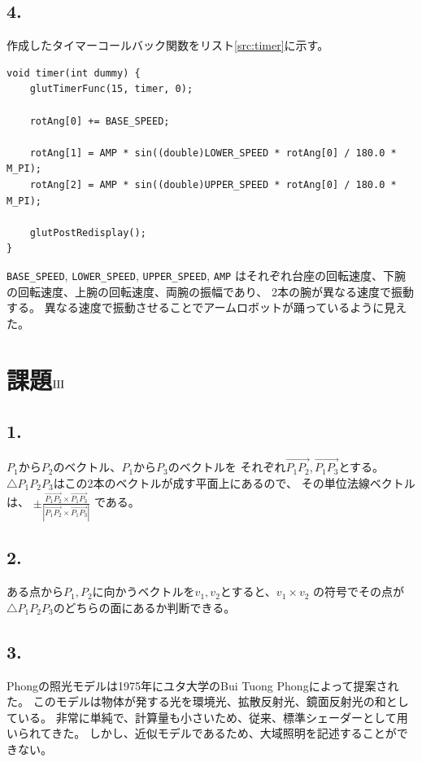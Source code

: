 \documentclass{jsarticle}
\begin{document}
    \subsection*{4.}
        作成したタイマーコールバック関数をリスト\ref{src:timer}に示す。

        \begin{lstlisting}[caption=タイマーコールバック関数, label=src:timer]
void timer(int dummy) {
    glutTimerFunc(15, timer, 0);

    rotAng[0] += BASE_SPEED;

    rotAng[1] = AMP * sin((double)LOWER_SPEED * rotAng[0] / 180.0 * M_PI);
    rotAng[2] = AMP * sin((double)UPPER_SPEED * rotAng[0] / 180.0 * M_PI);

    glutPostRedisplay();
}\end{lstlisting}
        
        \verb|BASE_SPEED|, \verb|LOWER_SPEED|, \verb|UPPER_SPEED|, \verb|AMP|
        はそれぞれ台座の回転速度、下腕の回転速度、上腕の回転速度、両腕の振幅であり、
        2本の腕が異なる速度で振動する。
        異なる速度で振動させることでアームロボットが踊っているように見えた。

\section*{課題$\rm I\hspace{-.01em}I\hspace{-.01em}I$}
    \subsection*{1.}
        $P_1$から$P_2$のベクトル、$P_1$から$P_3$のベクトルを
        それぞれ$\overrightarrow{P_1P_2}, \overrightarrow{P_1P_3}$とする。
        $\triangle{P_1P_2P_3}$はこの2本のベクトルが成す平面上にあるので、
        その単位法線ベクトルは、
        $\displaystyle\pm\frac{\overrightarrow{P_1P_2}\times\overrightarrow{P_1P_3}}{|\overrightarrow{P_1P_2}\times\overrightarrow{P_1P_3}|}$
        である。

    \subsection*{2.}
        ある点から$P_1, P_2$に向かうベクトルを$v_1, v_2$とすると、$v_1\times v_2$
        の符号でその点が$\triangle P_1P_2P_3$のどちらの面にあるか判断できる。
        
    \subsection*{3.}
        Phongの照光モデルは1975年にユタ大学のBui Tuong Phongによって提案された\cite{phong}。
        このモデルは物体が発する光を環境光、拡散反射光、鏡面反射光の和としている。
        非常に単純で、計算量も小さいため、従来、標準シェーダーとして用いられてきた。
        しかし、近似モデルであるため、大域照明を記述することができない。
\end{document}
